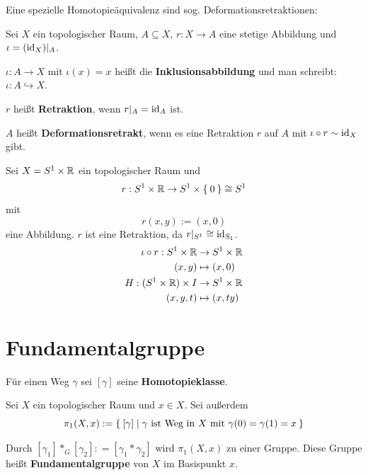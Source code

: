Eine spezielle Homotopieäquivalenz sind sog. Deformationsretraktionen:
\begin{definition}%
    Sei $X$ ein topologischer Raum, $A \subseteq X$, $r: X \rightarrow A$ eine stetige Abbildung
    und $\iota = (\textnormal{id}_X)|_A$.

    \begin{defenum}
        \item $\iota: A \rightarrow X$ mit $\iota(x) = x$ heißt die 
              \textbf{Inklusionsabbildung} und
              man schreibt: $\iota: A \hookrightarrow X$.
        \item $r$ heißt \textbf{Retraktion}, wenn $r|_A = \textnormal{id}_A$ ist.
        \item $A$ heißt \textbf{Deformationsretrakt}, wenn es eine Retraktion $r$
              auf $A$ mit $\iota  \circ r \sim \textnormal{id}_X$ gibt.
    \end{defenum}
\end{definition}

\begin{beispiel}
    Sei $X = S^1 \times \mathbb{R}$ ein topologischer Raum und
    \[r: S^1 \times \mathbb{R} \rightarrow S^1 \times \Set{0} \cong S^1\]
    mit
    \[r(x,y) := (x, 0)\]
    eine Abbildung. $r$ ist eine Retraktion, da $r|_{S^1} \cong \textnormal{id}_{S_1}$.
    \begin{align*}
        \iota \circ r : S^1 \times \mathbb{R} &\rightarrow S^1 \times \mathbb{R}\\
        (x,y) &\mapsto (x,0)\\
        H: (S^1 \times \mathbb{R}) \times I &\rightarrow S^1 \times \mathbb{R}\\
        (x, y, t) &\mapsto (x, ty)
    \end{align*}
\end{beispiel}

\section{Fundamentalgruppe}
Für einen Weg $\gamma$ sei $[\gamma]$ seine \textbf{Homotopieklasse}.

\begin{definition}%
    Sei $X$ ein topologischer Raum und $x \in X$. Sei außerdem
    \[\pi_1(X,x) := \Set{[\gamma] | \gamma \text{ ist Weg in } X \text{ mit } \gamma(0) = \gamma(1) = x}\]

    Durch $[\gamma_1] *_G [\gamma_2] : = [\gamma_1 * \gamma_2]$ wird
    $\pi_1(X,x)$ zu einer Gruppe. Diese Gruppe heißt \textbf{Fundamentalgruppe}
    von $X$ im Basispunkt $x$.
\end{definition}

